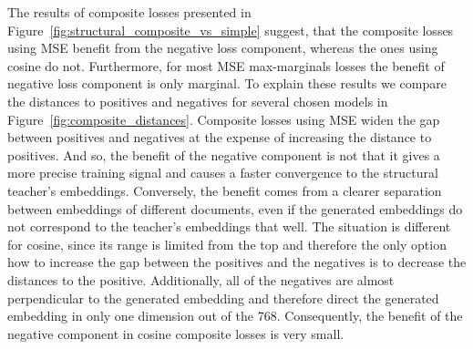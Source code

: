The results of composite losses presented in
Figure~\ref{fig:structural_composite_vs_simple} suggest, that the composite
losses using MSE benefit from the negative loss component, whereas the ones
using cosine do not. Furthermore, for most MSE max-marginals losses the benefit
of negative loss component is only marginal. To explain these results we
compare the distances to positives and negatives for several chosen models in
Figure~\ref{fig:composite_distances}. Composite losses using MSE widen the gap
between positives and negatives at the expense of increasing the distance to
positives. And so, the benefit of the negative component is not that it gives a
more precise training signal and causes a faster convergence to the structural
teacher's embeddings. Conversely, the benefit comes from a clearer separation
between embeddings of different documents, even if the generated embeddings do
not correspond to the teacher's embeddings that well. The situation is
different for cosine, since its range is limited from the top and therefore the
only option how to increase the gap between the positives and the negatives is
to decrease the distances to the positive. Additionally, all of the negatives
are almost perpendicular to the generated embedding and therefore direct the
generated embedding in only one dimension out of the 768. Consequently, the
benefit of the negative component in cosine composite losses is very small.

